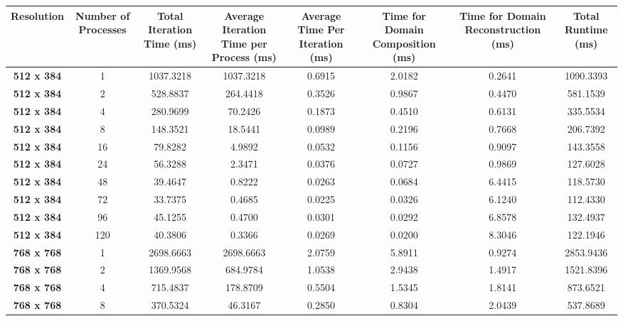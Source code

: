 \documentclass[11pt, a4paper]{article}
\begin{document}
		\begin{table}
			\centering
			 \begin{tabular}{|c|c|c|c|c|c|c|c|}
				\hline
				\multicolumn{1}{|p{7.5em}|}{\textbf{Resolution}} & \multicolumn{1}{p{7.5em}|}{\textbf{Number of Processes}} & \multicolumn{1}{p{7.5em}|}{\textbf{Total Iteration Time (ms)}} & \multicolumn{1}{p{7.5em}|}{\textbf{Average Iteration Time per Process (ms)}} & \multicolumn{1}{p{7.5em}|}{\textbf{Average Time Per Iteration (ms)}} & \multicolumn{1}{p{7.5em}|}{\textbf{Time for Domain Composition (ms)}} & \multicolumn{1}{p{7.5em}|}{\textbf{Time for Domain Reconstruction (ms)}} & \multicolumn{1}{p{7.5em}|}{\textbf{Total Runtime (ms)}}\\
				\hline
				\textbf{512 x 384} & 1     & 1037.3218 & 1037.3218 & 0.6915 & 2.0182 & 0.2641 & 1090.3393 \\
				\textbf{512 x 384} & 2     & 528.8837 & 264.4418 & 0.3526 & 0.9867 & 0.4470 & 581.1539 \\
				\textbf{512 x 384} & 4     & 280.9699 & 70.2426 & 0.1873 & 0.4510 & 0.6131 & 335.5534 \\
				\textbf{512 x 384} & 8     & 148.3521 & 18.5441 & 0.0989 & 0.2196 & 0.7668 & 206.7392 \\
				\textbf{512 x 384} & 16    & 79.8282 & 4.9892 & 0.0532 & 0.1156 & 0.9097 & 143.3558 \\
				\textbf{512 x 384} & 24    & 56.3288 & 2.3471 & 0.0376 & 0.0727 & 0.9869 & 127.6028 \\
				\textbf{512 x 384} & 48    & 39.4647 & 0.8222 & 0.0263 & 0.0684 & 6.4415 & 118.5730 \\
				\textbf{512 x 384} & 72    & 33.7375 & 0.4685 & 0.0225 & 0.0326 & 6.1240 & 112.4330 \\
				\textbf{512 x 384} & 96    & 45.1255 & 0.4700 & 0.0301 & 0.0292 & 6.8578 & 132.4937 \\
				\textbf{512 x 384} & 120   & 40.3806 & 0.3366 & 0.0269 & 0.0200 & 8.3046 & 122.1946 \\
				\hline
				\textbf{768 x 768} & 1     & 2698.6663 & 2698.6663 & 2.0759 & 5.8911 & 0.9274 & 2853.9436 \\
				\textbf{768 x 768} & 2     & 1369.9568 & 684.9784 & 1.0538 & 2.9438 & 1.4917 & 1521.8396 \\
				\textbf{768 x 768} & 4     & 715.4837 & 178.8709 & 0.5504 & 1.5345 & 1.8141 & 873.6521 \\
				\textbf{768 x 768} & 8     & 370.5324 & 46.3167 & 0.2850 & 0.8304 & 2.0439 & 537.8689 \\

\end{tabular}
\end{table}
\end{document}
